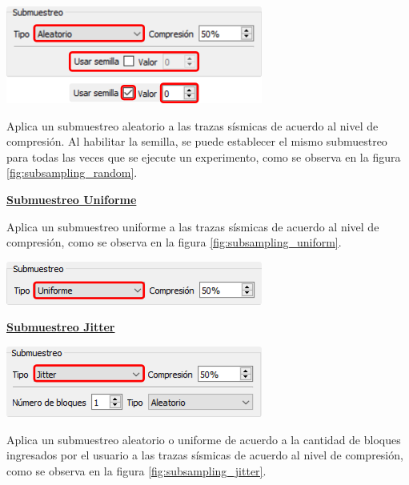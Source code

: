 \documentclass[12pt,twoside,letter]{ol-softwaremanual}
\newenvironment{Figure}
  {\par\medskip\noindent\minipage{\linewidth}}
  {\endminipage\par\medskip}
\begin{document}
\begin{multicols}{2}
\begin{Figure}
	\centering
	\includegraphics[width=0.8\linewidth]{subsampling-random.png}
	\label{fig:subsampling_random}
\end{Figure}

Aplica un submuestreo aleatorio a las trazas sísmicas de acuerdo al nivel de compresión. Al habilitar la semilla, se puede establecer el mismo submuestreo para todas las veces que se ejecute un experimento, como se observa en la figura \ref{fig:subsampling_random}.

\end{multicols}

\underline{\textbf{Submuestreo Uniforme}}

\begin{multicols}{2}

Aplica un submuestreo uniforme a las trazas sísmicas de acuerdo al nivel de compresión, como se observa en la figura \ref{fig:subsampling_uniform}.

\begin{Figure}
    \centering
    \includegraphics[width=0.8\linewidth]{subsampling-uniform.png}
    \label{fig:subsampling_uniform}
\end{Figure}

\end{multicols}

\underline{\textbf{Submuestreo Jitter}}

\begin{multicols}{2}

\begin{Figure}
	\centering
	\includegraphics[width=0.8\linewidth]{subsampling-jitter.png}
	\label{fig:subsampling_jitter}
\end{Figure}

Aplica un submuestreo aleatorio o uniforme de acuerdo a la cantidad de bloques ingresados por el usuario a las trazas sísmicas de acuerdo al nivel de compresión, como se observa en la figura \ref{fig:subsampling_jitter}.

\end{multicols}
\end{document}
